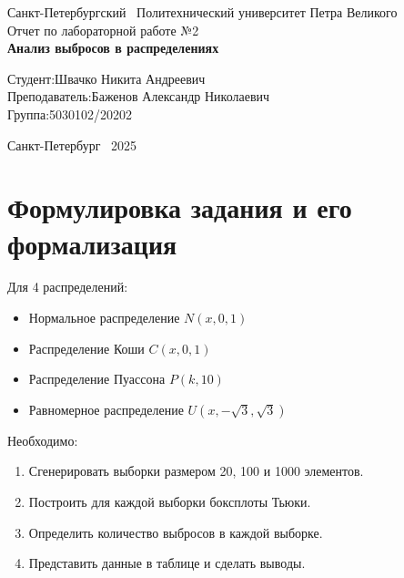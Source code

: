 \documentclass[a4paper]{article}
\begin{document}
    \begin{titlepage}
        \Large
        \begin{center}
            Санкт-Петербургский \ Политехнический университет Петра Великого\\
            \vspace{10em}Отчет по лабораторной работе №2\\
            \vspace{2em}
            \textbf{Анализ выбросов в распределениях}
        \end{center}
        \vspace{6em}
        \hfill\parbox{10cm}{
            \hspace*{2cm}\hspace*{-4cm}Студент:\hfill Швачко Никита Андреевич\\
            \hspace*{2cm}\hspace*{-4cm}Преподаватель:\hfill Баженов Александр Николаевич\\
            \hspace*{2cm}\hspace*{-4cm}Группа:\hfill 5030102/20202
        }
        \vspace{\fill}
        \begin{center}
            Санкт-Петербург \ 2025
        \end{center}
    \end{titlepage}


    \section{Формулировка задания и его формализация}\label{sec:task}
    Для 4 распределений:
    \begin{itemize}
        \item Нормальное распределение $N(x, 0,1)$
        \item Распределение Коши $C(x, 0,1)$
        \item Распределение Пуассона $P(k, 10)$
        \item Равномерное распределение $U(x,-\sqrt{3}, \sqrt{3})$
    \end{itemize}
    Необходимо:
    \begin{enumerate}
        \item Сгенерировать выборки размером 20, 100 и 1000 элементов.
        \item Построить для каждой выборки боксплоты Тьюки.
        \item Определить количество выбросов в каждой выборке.
        \item Представить данные в таблице и сделать выводы.
    \end{enumerate}
\end{document}
